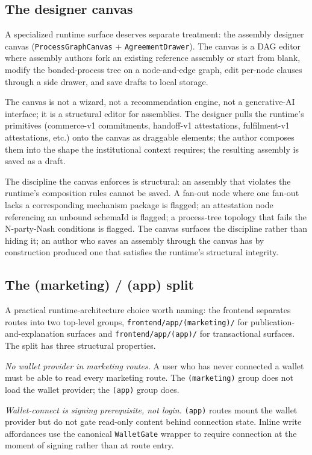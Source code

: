 \documentclass[11pt,a4paper]{article}
\theoremstyle{definition}
\theoremstyle{remark}
\begin{document}
\subsection{The designer canvas}

A specialized runtime surface deserves separate treatment: the
assembly designer canvas (\texttt{ProcessGraphCanvas} +
\texttt{AgreementDrawer}). The canvas is a DAG editor where assembly
authors fork an existing reference assembly or start from blank,
modify the bonded-process tree on a node-and-edge graph, edit
per-node clauses through a side drawer, and save drafts to local
storage.

The canvas is not a wizard, not a recommendation engine, not a
generative-AI interface; it is a structural editor for assemblies.
The designer pulls the runtime's primitives (commerce-v1 commitments,
handoff-v1 attestations, fulfilment-v1 attestations, etc.) onto the
canvas as draggable elements; the author composes them into the
shape the institutional context requires; the resulting assembly is
saved as a draft.

The discipline the canvas enforces is structural: an assembly that
violates the runtime's composition rules cannot be saved. A
fan-out node where one fan-out lacks a corresponding mechanism
package is flagged; an attestation node referencing an unbound
schemaId is flagged; a process-tree topology that fails the
N-party-Nash conditions is flagged. The canvas surfaces the
discipline rather than hiding it; an author who saves an assembly
through the canvas has by construction produced one that satisfies
the runtime's structural integrity.

\subsection{The (marketing) / (app) split}

A practical runtime-architecture choice worth naming: the frontend
separates routes into two top-level groups,
\texttt{frontend/app/(marketing)/} for publication-and-explanation
surfaces and \texttt{frontend/app/(app)/} for transactional
surfaces. The split has three structural properties.

\emph{No wallet provider in marketing routes.} A user who has never
connected a wallet must be able to read every marketing route. The
\texttt{(marketing)} group does not load the wallet provider; the
\texttt{(app)} group does.

\emph{Wallet-connect is signing prerequisite, not login.}
\texttt{(app)} routes mount the wallet provider but do not gate
read-only content behind connection state. Inline write affordances
use the canonical \texttt{WalletGate} wrapper to require connection
at the moment of signing rather than at route entry.
\end{document}
